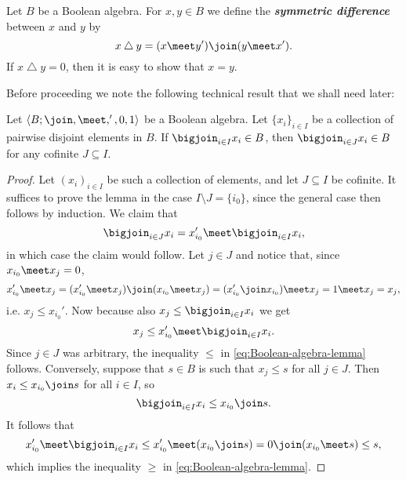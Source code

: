 \documentclass[article, a4paper, 11pt, oneside]{memoir}
\numberwithin{equation}{chapter}
\renewcommand{\symdiff}{\mathbin{\triangle}}
\newcommand{\keyword}[1]{{\itshape\bfseries #1}}
\begin{document}
Let $B$ be a Boolean algebra. For $x,y \in B$ we define the \keyword{symmetric difference} between $x$ and $y$ by
%
\begin{equation*}
    x \symdiff y
        = (x \meet y') \join (y \meet x').
\end{equation*}
%
If $x \symdiff y = 0$, then it is easy to show that $x = y$.

Before proceeding we note the following technical result that we shall need later:

\begin{lemma}
    \label{thm:refine_join}
    Let $\langle B; \join, \meet, ', 0, 1 \rangle$ be a Boolean algebra. Let $\{x_i\}_{i \in I}$ be a collection of pairwise disjoint elements in $B$. If $\bigjoin_{i \in I} x_i \in B$, then $\bigjoin_{i \in J} x_i \in B$ for any cofinite\footnotemark{} $J \subseteq I$.
\end{lemma}

\begin{proof}
    Let $(x_i)_{i \in I}$ be such a collection of elements, and let $J \subseteq I$ be cofinite. It suffices to prove the lemma in the case $I \setminus J = \{i_0\}$, since the general case then follows by induction. We claim that
    \begin{equation}
        \label{eq:Boolean-algebra-lemma}
        \bigjoin_{i \in J} x_i
            = x_{i_0}' \meet \bigjoin_{i \in I} x_i,
    \end{equation}
    in which case the claim would follow. Let $j \in J$ and notice that, since $x_{i_0} \meet x_j = 0$,
    \begin{equation*}
        x_{i_0}' \meet x_j
            = (x_{i_0}' \meet x_j) \join (x_{i_0} \meet x_j)
            = (x_{i_0}' \join x_{i_0}) \meet x_j
            = 1 \meet x_j
            = x_j,
    \end{equation*}
    i.e. $x_j \leq x_{i_0}'$. Now because also $x_j \leq \bigjoin_{i \in I} x_i$ we get
    \begin{equation*}
        x_j
            \leq x_{i_0}' \meet \bigjoin_{i \in I} x_i.
    \end{equation*}
    Since $j \in J$ was arbitrary, the inequality $\leq$ in \cref{eq:Boolean-algebra-lemma} follows. Conversely, suppose that $s \in B$ is such that $x_j \leq s$ for all $j \in J$. Then $x_i \leq x_{i_0} \join s$ for all $i \in I$, so
    \begin{equation*}
        \bigjoin_{i \in I} x_i
            \leq x_{i_0} \join s.
    \end{equation*}
    It follows that
    \begin{equation*}
        x_{i_0}' \meet \bigjoin_{i \in I} x_i
            \leq x_{i_0}' \meet (x_{i_0} \join s)
            = 0 \join (x_{i_0} \meet s)
            \leq s,
    \end{equation*}
    which implies the inequality $\geq$ in \cref{eq:Boolean-algebra-lemma}.
\end{proof}
\end{document}
